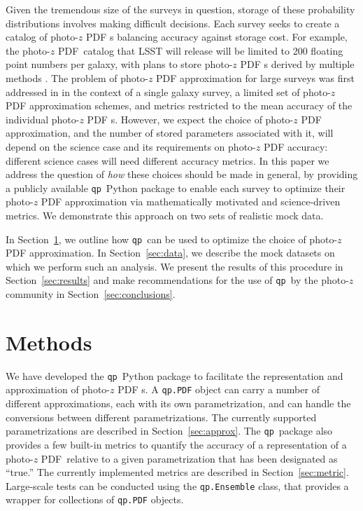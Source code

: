 \documentclass[\docopts]{\docclass}
\newcommand{\qp}{\texttt{qp}\xspace}
\newcommand{\pz}{photo-$z$ PDF\xspace}
\begin{document}
Given the tremendous size of the surveys in question, storage of these
probability distributions involves making difficult decisions.  Each survey
seeks to create a catalog of \pz s balancing accuracy against storage
cost.  For example, the \pz\ catalog that LSST will release will be limited to
200 floating point numbers per galaxy, with plans to store \pz s derived by
multiple methods \citep{juric_data_2017}.
The problem of \pz approximation for large surveys was first addressed in \citet{carrasco_kind_sparse_2014} in the
context of a single galaxy survey, a limited set of \pz approximation schemes, and
metrics restricted to the mean accuracy of the individual \pz s. However, we expect the choice of \pz approximation, and the number of
stored parameters associated with it, will
depend on the science case and its requirements on \pz accuracy: different science cases will need different accuracy metrics.  In this paper we address the question of \textit{how} these choices should be
made in general, by providing a publicly available \qp\ Python package  to enable each survey to optimize their \pz approximation via mathematically motivated and science-driven metrics. We
demonstrate this approach on two sets of realistic mock data.

In Section~\ref{sec:methods}, we outline how \qp\ can be used to optimize the
choice of \pz approximation.  In Section~\ref{sec:data}, we
describe the mock datasets on which we perform such an analysis.  We present
the results of this procedure in Section~\ref{sec:results} and make
recommendations for the use of \qp\ by the photo-$z$ community in Section~\ref{sec:conclusions}.








\section{Methods}
\label{sec:methods}

We have developed the \qp\ Python package to facilitate the representation and approximation of \pz s.
A \texttt{qp.PDF} object can carry a number of different approximations, each with its own parametrization, and can handle the  conversions between different parametrizations.  The currently supported parametrizations are described in
Section~\ref{sec:approx}. The \qp\ package also provides a few built-in metrics to quantify the
accuracy of a representation of a \pz\ relative to a given
parametrization that has been designated as ``true.''  The currently implemented metrics are
described in Section~\ref{sec:metric}. Large-scale tests can be conducted using the
\texttt{qp.Ensemble} class, that provides a wrapper for collections of \texttt{qp.PDF} objects.
\end{document}

